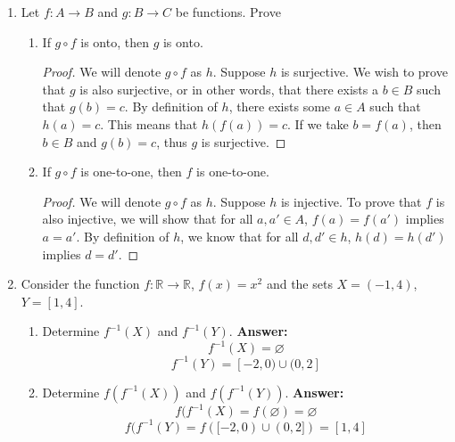 \documentclass{article}
\begin{document}
\begin{enumerate}
        \item Let $f : A \to B$ and $g : B \to C$ be functions. Prove
        
            \begin{enumerate}
                \item If $g \circ f$ is onto, then $g$ is onto.
                    \begin{proof}
                        We will denote $g \circ f$ as $h$. Suppose $h$ is surjective. We wish to prove that $g$ is also surjective, or in other words, that there exists a $b \in B$ such that $g(b) = c$. By definition of $h$, there exists some $a \in A$ such that $h(a) = c$. This means that $h(f(a)) = c$. If we take $b = f(a)$, then $b \in B$ and $g(b) = c$, thus $g$ is surjective.
                        
                    \end{proof}
                    
                \item If $g \circ f$ is one-to-one, then $f$ is one-to-one.
                    \begin{proof}
                        We will denote $g \circ f$ as $h$. Suppose $h$ is injective. To prove that $f$ is also injective, we will show that for all $a, a' \in A$, $f(a) = f(a')$ implies $a = a'$. By definition of $h$, we know that for all $d, d' \in h$, $h(d) = h(d')$ implies $d = d'$. 
                    \end{proof}
            \end{enumerate}

        \item Consider the function $f : \mathbb{R} \to \mathbb{R}$, $f(x) = x^2$ and the sets $X = (-1,4)$, $Y = [1,4]$.

            \begin{enumerate}
                \item Determine $f^{-1}(X)$ and $f^{-1}(Y)$.
                \newline\textbf{Answer:}
                \[f^{-1}(X) = \varnothing\]
                \[f^{-1}(Y) = [-2, 0) \cup (0, 2]\]

                \item Determine $f(f^{-1}(X))$ and $f(f^{-1}(Y))$.
                \newline\textbf{Answer:}
                \[f(f^{-1}(X) = f(\varnothing) = \varnothing\]
                \[f(f^{-1}(Y) = f([-2, 0) \cup (0, 2]) = [1, 4]\]
            \end{enumerate}
            

\end{enumerate}
\end{document}
